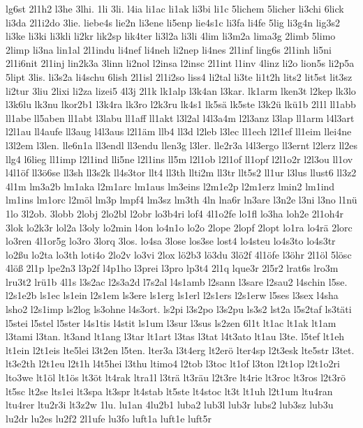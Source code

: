 {lg6st
2l1h2
l3he
3lhi.
1li
3li.
l4ia
li1ac
li1ak
li3bi
li1c
5lichem
5licher
li3chi
6lick
li3da
2l1i2do
3lie.
liebe4s
lie2n
li3ene
li5enp
lie4s1c
li3fa
li4fe
5lig
li3g4n
lig3s2
li3ke
li3ki
li3kli
li2kr
lik2sp
lik4ter
li3l2a
li3li
4lim
li3m2a
lima3g
2limb
5limo
2limp
li3na
lin1al
2l1indu
li4nef
li4neh
li2nep
li4nes
2l1inf
ling6s
2l1inh
li5ni
2l1i6nit
2l1inj
lin2k3a
3linn
li2nol
l2insa
l2insc
2l1int
l1inv
4linz
li2o
lion5s
li2p5a
5lipt
3lis.
li3s2a
li4schu
6lish
2l1isl
2l1i2so
liss4
li2tal
li3te
li1t2h
lits2
lit5st
lit3sz
li2tur
3liu
2lixi
li2za
lizei5
4l3j
2l1k
lk1alp
l3k4an
l3kar.
lk1arm
lken3t
l2kep
lk3lo
l3k6lu
lk3nu
lkor2b1
l3k4ra
lk3ro
l2k3ru
lk4s1
lk5sä
lk5ste
l3k2ü
lkü1b
2l1l
ll1abb
ll1abe
ll5aben
ll1abt
l3labu
ll1aff
ll1akt
l3l2al
l4l3a4m
l2l3anz
l3lap
ll1arm
l4l3art
l2l1au
ll4aufe
ll3aug
l4l3aus
l2l1äm
llb4
ll3d
l2leb
l3lec
ll1ech
l2l1ef
ll1eim
llei4ne
l3l2em
l3len.
lle6n1a
ll3endl
ll3endu
llen3g
l3ler.
lle2r3a
l4l3ergo
ll3ernt
l2lerz
ll2es
llg4
l6lieg
ll1imp
l2l1ind
lli5ne
l2l1ins
ll5m
l2l1ob
l2l1of
ll1opf
l2l1o2r
l2l3ou
ll1ov
l4l1öf
ll3ö6se
ll3sh
ll3s2k
ll4s3tor
llt4
ll3th
llti2m
ll3tr
llt5s2
ll1ur
l3lus
llust6
ll3z2
4l1m
lm3a2b
lm1aka
l2m1arc
lm1aus
lm3eins
l2m1e2p
l2m1erz
lmin2
lm1ind
lm1ins
lm1orc
l2möl
lm3p
lmpf4
lm3sz
lm3th
4ln
lna6r
ln3are
l3n2e
l3ni
l3no
l1nü
1lo
3l2ob.
3lobb
2lobj
2lo2bl
l2obr
lo3b4ri
lof4
4l1o2fe
lo1fl
lo3ha
loh2e
2l1oh4r
3lok
lo2k3r
lol2a
l3oly
lo2min
l4on
lo4n1o
lo2o
2lope
2lopf
2lopt
lo1ra
lo4rä
2lorc
lo3ren
4l1or5g
lo3ro
3lorq
3los.
lo4sa
3lose
los3se
lost4
lo4steu
lo4s3to
lo4s3tr
lo2ßu
lo2ta
lo3th
loti4o
2lo2v
lo3vi
2lox
lö2b3
lö3du
3lö2f
4l1öfe
l3öhr
2l1öl
5lösc
4löß
2l1p
lpe2n3
l3p2f
l4p1ho
l3prei
l3pro
lp3t4
2l1q
lque3r
2l5r2
lrat6s
lro3m
lru3t2
lrü1b
4l1s
l3s2ac
l2s3a2d
l7s2al
l4s1amb
l2sann
l3sare
l2sau2
l4schin
l5se.
l2s1e2b
ls1ec
ls1ein
l2s1em
ls3ere
ls1erg
ls1erl
l2s1ers
l2s1erw
l5ses
l3sex
l4sha
lsho2
l2s1imp
ls2log
ls3ohne
l4s3ort.
ls2pi
l3s2po
l3s2pu
ls3s2
lst2a
l5s2taf
ls3täti
l5stei
l5stel
l5ster
l4s1tis
l4stit
ls1um
l3sur
l3sus
ls2zen
6l1t
lt1ac
lt1ak
lt1am
l3tami
l3tan.
lt3and
lt1ang
l3tar
lt1art
l3tas
l3tat
l4t3ato
lt1au
l3te.
l5tef
lt1eh
lt1ein
l2t1eis
lte5lei
l3t2en
l5ten.
lter3a
l3t4erg
lt2erö
lter4sp
l2t3esk
lte5str
l3tet.
lt3e2th
l2t1eu
l2t1h
l4t5hei
l3thu
ltimo4
l2tob
l3toc
lt1of
l3ton
l2t1op
l2t1o2ri
lto3we
lt1öl
lt1ös
lt3öt
lt4rak
ltra1l
l3trä
lt3räu
l2t3re
lt4rie
lt3roc
lt3ros
l2t3rö
lt5sc
lt2se
lts1ei
lt3spa
lt3spr
lt4stab
lt5ste
lt4stoc
lt3t
lt1uh
l2t1um
ltu4ran
ltu4rer
ltu2r3i
lt3z2w
1lu.
lu1an
4lu2b1
luba2
lub3l
lub3r
lubs2
lub3sz
lub3u
lu2dr
lu2es
lu2f2
2l1ufe
lu3fo
luft1a
luft1e
luft5r
}
